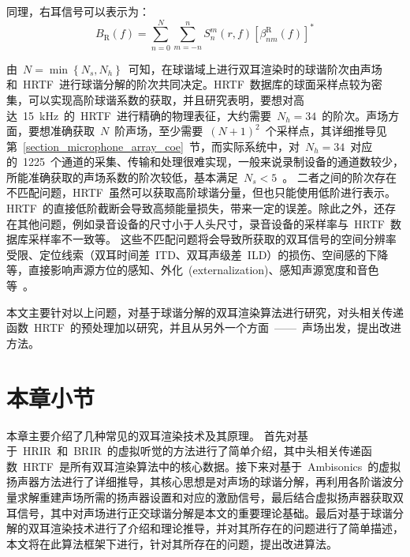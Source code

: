 同理，右耳信号可以表示为：
\begin{equation}
B_{\text{R}}(f) = \sum_{n=0}^{N}\sum_{m=-n}^{n} S_n^m(r,f) \left[ \beta_{nm}^{\text{R}}(f)\right]^{*}
\label{eq.BR}
\end{equation}


由~$N=\min \left\{ N_{s},N_{h} \right\}$~可知，在球谐域上进行双耳渲染时的球谐阶次由声场和~HRTF~进行球谐分解的阶次共同决定。HRTF~数据库的球面采样点较为密集，可以实现高阶球谐系数的获取，并且研究表明，要想对高达~15~kHz~的~HRTF~进行精确的物理表征，大约需要~$N_{h}= 34$~的阶次。声场方面，要想准确获取~$N$~阶声场，至少需要~$(N+1)^2$~个采样点，其详细推导见第~\ref{section_microphone_array_coe}~节，而实际系统中，对~$N_{h}=34$~对应的~1225~个通道的采集、传输和处理很难实现，一般来说录制设备的通道数较少，所能准确获取的声场系数的阶次较低，基本满足~$N_{s}<5$~。
二者之间的阶次存在不匹配问题，HRTF~虽然可以获取高阶球谐分量，但也只能使用低阶进行表示。HRTF~的直接低阶截断会导致高频能量损失，带来一定的误差。除此之外，还存在其他问题，例如录音设备的尺寸小于人头尺寸，录音设备的采样率与~HRTF~数据库采样率不一致等。
这些不匹配问题将会导致所获取的双耳信号的空间分辨率受限、定位线索（双耳时间差~ITD、双耳声级差~ILD）的损伤、空间感的下降等，直接影响声源方位的感知、外化~(externalization)、感知声源宽度和音色等~。


本文主要针对以上问题，对基于球谐分解的双耳渲染算法进行研究，对头相关传递函数~HRTF~的预处理加以研究，并且从另外一个方面~——~声场出发，提出改进方法。

\newpage
\section{本章小节}
本章主要介绍了几种常见的双耳渲染技术及其原理。 首先对基于~HRIR~和~BRIR~的虚拟听觉的方法进行了简单介绍，其中头相关传递函数~HRTF~是所有双耳渲染算法中的核心数据。接下来对基于~Ambisonics~的虚拟扬声器方法进行了详细推导，其核心思想是对声场的球谐分解，再利用各阶谐波分量求解重建声场所需的扬声器设置和对应的激励信号，最后结合虚拟扬声器获取双耳信号，其中对声场进行正交球谐分解是本文的重要理论基础。最后对基于球谐分解的双耳渲染技术进行了介绍和理论推导，并对其所存在的问题进行了简单描述，本文将在此算法框架下进行，针对其所存在的问题，提出改进算法。